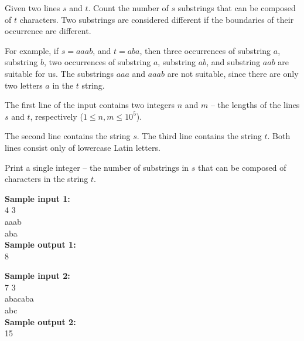 \documentclass[a4paper]{article}
\begin{document}
Given two lines $s$ and $t$. Count the number of $s$ substrings that can be composed of $t$ characters. Two substrings are considered different if the boundaries of their occurrence are different.

For example, if $s = aaab$, and $t = aba$, then three occurrences of substring $a$, substring $b$, two occurrences of substring $a$, substring $ab$, and substring $aab$ are suitable for us. The substrings $aaa$ and $aaab$ are not suitable, since there are only two letters $a$ in the $t$ string.

The first line of the input contains two integers $n$ and $m$ -- the lengths of the lines $s$ and $t$, respectively ($1 \le n, m \le 10^5$).

The second line contains the string $s$. The third line contains the string $t$. Both lines consist only of lowercase Latin letters.

Print a single integer -- the number of substrings in $s$ that can be composed of characters in the string $t$.

\LINE

\noindent \textbf{Sample input 1:}\\
4 3\\
aaab\\
aba\\


\noindent \textbf{Sample output 1:}\\
8

\SPACE

\noindent \textbf{Sample input 2:}\\
7 3\\
abacaba\\
abc\\


\noindent \textbf{Sample output 2:}\\
15
\end{document}

